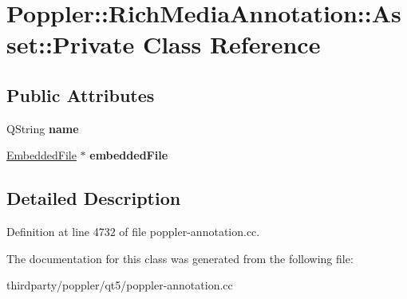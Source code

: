 \hypertarget{class_poppler_1_1_rich_media_annotation_1_1_asset_1_1_private}{}\section{Poppler\+:\+:Rich\+Media\+Annotation\+:\+:Asset\+:\+:Private Class Reference}
\label{class_poppler_1_1_rich_media_annotation_1_1_asset_1_1_private}
\subsection*{Public Attributes}
\begin{DoxyCompactItemize}
\item 
\mbox{\label{class_poppler_1_1_rich_media_annotation_1_1_asset_1_1_private_adcfcad1b941d3b7ae007c833de8db9ae}} 
Q\+String {\bfseries name}
\item 
\mbox{\label{class_poppler_1_1_rich_media_annotation_1_1_asset_1_1_private_adb713a1872e70cadb0959ef4ffa07244}} 
\hyperlink{class_poppler_1_1_embedded_file}{Embedded\+File} $\ast$ {\bfseries embedded\+File}
\end{DoxyCompactItemize}


\subsection{Detailed Description}


Definition at line 4732 of file poppler-\/annotation.\+cc.



The documentation for this class was generated from the following file\+:\begin{DoxyCompactItemize}
\item 
thirdparty/poppler/qt5/poppler-\/annotation.\+cc\end{DoxyCompactItemize}
